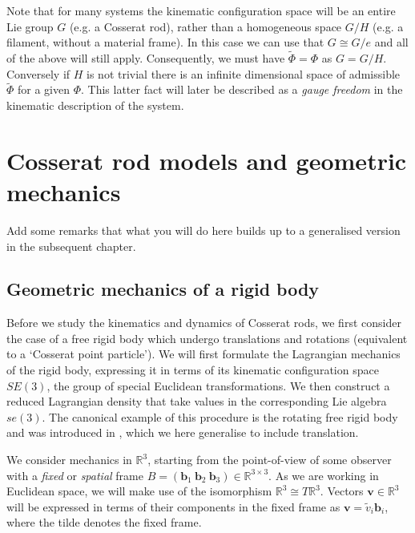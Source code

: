 Note that for many systems the kinematic configuration space will be an entire Lie group $G$ (e.g. a Cosserat rod), rather than a homogeneous space $G/H$ (e.g. a filament, without a material frame). In this case we can use that $G \cong G / e$ and all of the above will still apply. Consequently, we must have $\tilde{\Phi} = \Phi$ as $G = G/H$. Conversely if $H$ is not trivial there is an infinite dimensional space of admissible $\tilde{\Phi}$ for a given $\Phi$. This latter fact will later be described as a \textit{gauge freedom} in the kinematic description of the system.






\chapter{Cosserat rod models and geometric mechanics} \label{ch:Cosserat rods}

{ \color{red} Add some remarks that what you will do here builds up to a generalised version in the subsequent chapter. } 

\section{Geometric mechanics of a rigid body} \label{sec:Introduction - rigid body}

Before we study the kinematics and dynamics of Cosserat rods, we first consider the case of a free rigid body which undergo translations and rotations (equivalent to a `Cosserat point particle'). We will first formulate the Lagrangian mechanics of the rigid body, expressing it in terms of its kinematic configuration space $SE(3)$, the group of special Euclidean transformations. We then construct a reduced Lagrangian density that take values in the corresponding Lie algebra $\textit{se}(3)$. The canonical example of this procedure is the rotating free rigid body and was introduced in \citep{marsdenIntroductionMechanicsSymmetry2013, holmEulerPoincareEquations1998, cendraLagrangianReductionEuler1999}, which we here generalise to include translation.

We consider mechanics in $\mathbb{R}^3$, starting from the point-of-view of some observer with a \textit{fixed} or \textit{spatial} frame $B = (\mathbf{b}_1\ \mathbf{b}_2\ \mathbf{b}_3) \in \mathbb{R}^{3 \times 3}$. As we are working in Euclidean space, we will make use of the isomorphism $\mathbb{R}^3 \cong T\mathbb{R}^3$. Vectors $\mathbf{v} \in \mathbb{R}^3$ will be expressed in terms of their components in the fixed frame as $\mathbf{v} = \tilde{v}_i \mathbf{b}_i$, where the tilde denotes the fixed frame.

